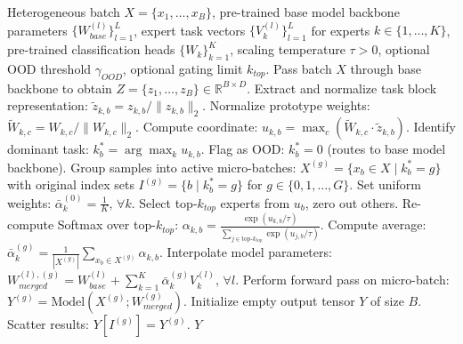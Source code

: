 \begin{algorithm}[tb]
\caption{PFSR + MBH + UNC Model Merging Framework}
\label{alg:pfsr_mbh}
\begin{algorithmic}[1]
 Heterogeneous batch $X = \{x_1, \dots, x_B\}$, pre-trained base model backbone parameters $\{W_{base}^{(l)}\}_{l=1}^L$, expert task vectors $\{V_k^{(l)}\}_{l=1}^L$ for experts $k \in \{1, \dots, K\}$, pre-trained classification heads $\{W_k\}_{k=1}^K$, scaling temperature $\tau > 0$, optional OOD threshold $\gamma_{OOD}$, optional gating limit $k_{top}$.
 Pass batch $X$ through base backbone to obtain $Z = \{z_1, \dots, z_B\} \in \mathbb{R}^{B \times D}$.
  \STATE Extract and normalize task block representation: $\tilde{z}_{k, b} = z_{k, b} / \|z_{k, b}\|_2$.
\ENDFOR
{}
    \STATE Normalize prototype weights: $\tilde{W}_{k,c} = W_{k,c} / \|W_{k,c}\|_2$.
  \ENDFOR
\ENDFOR
{}
  \STATE Compute coordinate: $u_{k, b} = \max_{c} ( \tilde{W}_{k, c} \cdot \tilde{z}_{k, b} )$.
\ENDFOR
{}
  \STATE Identify dominant task: $k_b^* = \arg\max_k u_{k, b}$.
    \STATE Flag as OOD: $k_b^* = 0$ (routes to base model backbone).
  \ENDIF
\ENDFOR
\STATE Group samples into active micro-batches: $X^{(g)} = \{x_b \in X \mid k_b^* = g\}$ with original index sets $I^{(g)} = \{b \mid k_b^* = g\}$ for $g \in \{0, 1, \dots, G\}$.
    \STATE Set uniform weights: $\bar{\alpha}_k^{(0)} = \frac{1}{K}, \, \forall k$.
  \ELSE
      \STATE Select top-$k_{top}$ experts from $u_b$, zero out others.
      \STATE Re-compute Softmax over top-$k_{top}$: $\alpha_{k, b} = \frac{\exp(u_{k, b} / \tau)}{\sum_{j \in \text{top-}k_{top}} \exp(u_{j, b} / \tau)}$.
    \ENDFOR
    \STATE Compute average: $\bar{\alpha}_k^{(g)} = \frac{1}{|X^{(g)}|} \sum_{x_b \in X^{(g)}} \alpha_{k, b}$.
  \ENDIF
  \STATE Interpolate model parameters: $W_{merged}^{(l), (g)} = W_{base}^{(l)} + \sum_{k=1}^K \bar{\alpha}_k^{(g)} V_k^{(l)}, \, \forall l$.
  \STATE Perform forward pass on micro-batch: $Y^{(g)} = \text{Model}(X^{(g)}; W_{merged}^{(g)})$.
\ENDFOR
{}
\STATE Initialize empty output tensor $Y$ of size $B$.
  \STATE Scatter results: $Y[I^{(g)}] = Y^{(g)}$.
\ENDFOR
{} $Y$
\end{algorithmic}
\end{algorithm}


